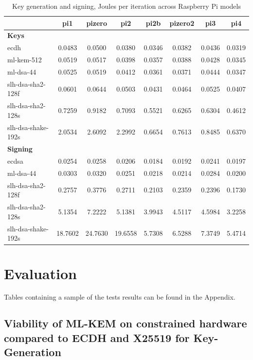 \documentclass[11pt, letterpaper]{article}
\begin{document}
\begin{table}[H]
\centering
\scriptsize
\caption{Key generation and signing, Joules per iteration across Raspberry Pi models}
\begin{tabular}{lccccccc}
\hline
 & pi1 & pizero & pi2 & pi2b & pizero2 & pi3 & pi4 \\
\hline

\multicolumn{8}{l}{\textbf{Keys}} \\

ecdh & 0.0483 & 0.0500 & 0.0380 & 0.0346 & 0.0382 & 0.0436 & 0.0319 \\
ml-kem-512 & 0.0519 & 0.0517 & 0.0398 & 0.0357 & 0.0388 & 0.0428 & 0.0345 \\
ml-dsa-44 & 0.0525 & 0.0519 & 0.0412 & 0.0361 & 0.0371 & 0.0444 & 0.0347 \\
slh-dsa-sha2-128f & 0.0601 & 0.0644 & 0.0503 & 0.0431 & 0.0464 & 0.0525 & 0.0407 \\
slh-dsa-sha2-128s & 0.7259 & 0.9182 & 0.7093 & 0.5521 & 0.6265 & 0.6304 & 0.4612 \\
slh-dsa-shake-192s & 2.0534 & 2.6092 & 2.2992 & 0.6654 & 0.7613 & 0.8485 & 0.6370 \\

\hline
\multicolumn{8}{l}{\textbf{Signing}} \\

ecdsa & 0.0254 & 0.0258 & 0.0206 & 0.0184 & 0.0192 & 0.0241 & 0.0197 \\
ml-dsa-44 & 0.0303 & 0.0320 & 0.0251 & 0.0218 & 0.0214 & 0.0284 & 0.0200 \\
slh-dsa-sha2-128f & 0.2757 & 0.3776 & 0.2711 & 0.2103 & 0.2359 & 0.2396 & 0.1730 \\
slh-dsa-sha2-128s & 5.1354 & 7.2222 & 5.1381 & 3.9943 & 4.5117 & 4.5984 & 3.2258 \\
slh-dsa-shake-192s & 18.7602 & 24.7630 & 19.6558 & 5.7308 & 6.5288 & 7.3749 & 5.4714 \\

\hline
\end{tabular}
\end{table}


\section{Evaluation}
Tables containing a sample of the tests results can be found in the Appendix.
\subsection{Viability of ML-KEM on constrained hardware compared to ECDH and X25519 for Key-Generation}
\end{document}
